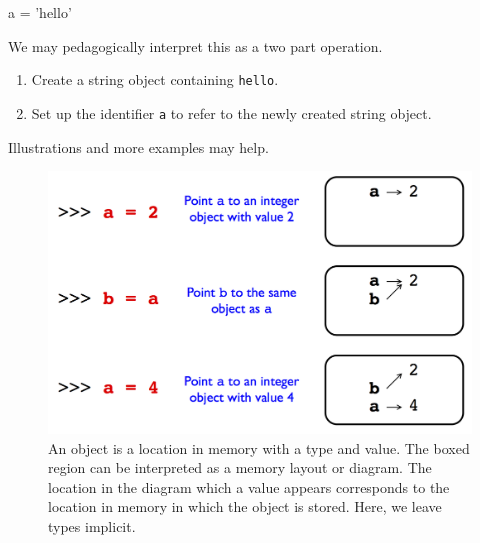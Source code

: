 \documentclass[12pt,letterpaper,twoside]{article}
\begin{document}
\begin{enumerate}
\begin{python}
a = 'hello'
\end{python}

We may pedagogically interpret this as a two part operation.
\vspace{-2ex}
\begin{enumerate}
\item
  Create a string object containing
  \texttt{\textquotesingle{}hello\textquotesingle{}}.
\item
  Set up the identifier \texttt{a} to refer to the newly created string
  object.
\end{enumerate}

Illustrations and more examples may help.
\vspace{-1ex}
\begin{figure}[h]
\centering
\includegraphics[scale=0.35]{fig/references-example.png}
\caption{\small An object is a location in memory with a type and value. The boxed region can be interpreted as a memory layout or diagram.
The location in the diagram which a value appears corresponds to the location in memory in which the object is stored. Here, we leave types implicit.}
\end{figure}



\end{enumerate}
\end{document}
